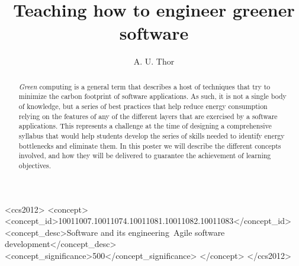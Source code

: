 \documentclass[sigconf]{acmart}
\begin{document}
\title{Teaching how to engineer greener software}

%
\author{A. U. Thor}

\renewcommand{\shortauthors}{A. U. Thor}

\begin{abstract}
{\em Green} computing is a general term that describes a host of techniques that
try to minimize the carbon footprint of software applications. As such, it is
not a single body of knowledge, but a series of best practices that help reduce
energy consumption relying on the features of any of the different layers that
are exercised by a software applications. This represents a challenge at the
time of designing a comprehensive syllabus that would help students develop the
series of skills needed to identify energy bottlenecks and eliminate them. In
this poster we will describe the different concepts involved, and how they will
be delivered to guarantee the achievement of learning objectives.
\end{abstract}

\begin{CCSXML}
<ccs2012>
   <concept>
       <concept_id>10011007.10011074.10011081.10011082.10011083</concept_id>
       <concept_desc>Software and its engineering~Agile software development</concept_desc>
       <concept_significance>500</concept_significance>
       </concept>
 </ccs2012>
\end{CCSXML}





\maketitle





\end{document}
